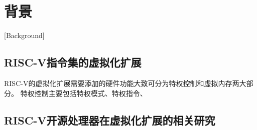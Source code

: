 
\chapter{背景}[Background]

\section{RISC-V指令集的虚拟化扩展}
RISC-V的虚拟化扩展需要添加的硬件功能大致可分为特权控制和虚拟内存两大部分。
特权控制主要包括特权模式、特权指令、

\section{RISC-V开源处理器在虚拟化扩展的相关研究}